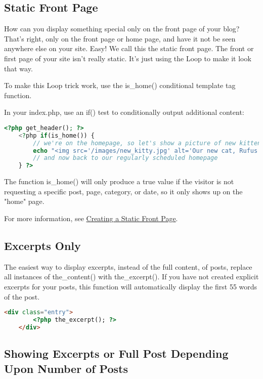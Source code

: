 \subsection{Static Front Page}

How can you display something special only on the front page of your blog? That's right, only on the front page or home page, and have it not be seen anywhere else on your site. Easy! We call this the static front page. The front or first page of your site isn't really static. It's just using the Loop to make it look that way.

To make this Loop trick work, use the is\_home() conditional template tag function.

In your index.php, use an if() test to conditionally output additional content:

\begin{lstlisting}[language=PHP]
	<?php get_header(); ?>
	<?php if(is_home()) { 
		// we're on the homepage, so let's show a picture of new kitten!
		echo "<img src='/images/new_kitty.jpg' alt='Our new cat, Rufus!' />";
		// and now back to our regularly scheduled homepage	
	} ?>
\end{lstlisting}

The function is\_home() will only produce a true value if the visitor is not requesting a specific post, page, category, or date, so it only shows up on the "home" page.

For more information, see \href{http://codex.wordpress.org/Creating_a_Static_Front_Page}{Creating a Static Front Page}.


\subsection{Excerpts Only}

The easiest way to display excerpts, instead of the full content, of posts, replace all instances of the\_content() with the\_excerpt(). If you have not created explicit excerpts for your posts, this function will automatically display the first 55 words of the post.

\begin{lstlisting}[language=HTML]
	<div class="entry">
		<?php the_excerpt(); ?>
	</div>
\end{lstlisting}

\subsection{Showing Excerpts or Full Post Depending Upon Number of Posts}

